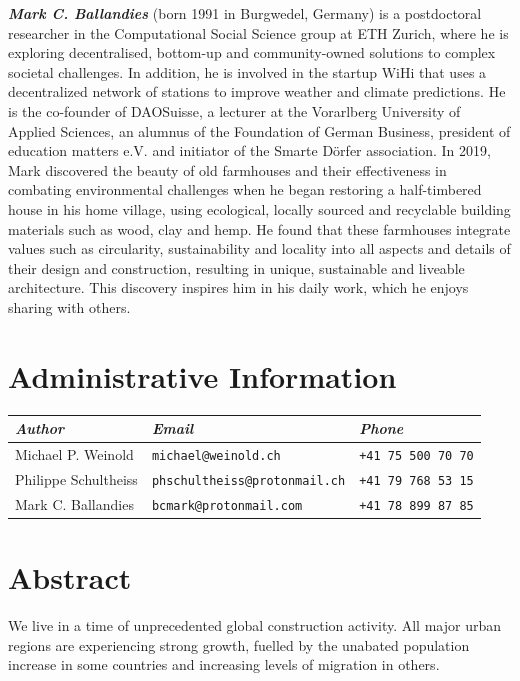 \documentclass[a4paper]{article}
\begin{document}
\textbf{\textit{Mark C. Ballandies}} (born 1991 in Burgwedel, Germany) is a postdoctoral researcher in the Computational Social Science group at ETH Zurich, where he is exploring decentralised, bottom-up and community-owned solutions to complex societal challenges. In addition, he is involved in the startup WiHi that uses a decentralized network of stations to improve weather and climate predictions. He is the co-founder of DAOSuisse, a lecturer at the Vorarlberg University of Applied Sciences, an alumnus of the Foundation of German Business, president of education matters e.V. and initiator of the Smarte Dörfer association. In 2019, Mark discovered the beauty of old farmhouses and their effectiveness in combating environmental challenges when he began restoring a half-timbered house in his home village, using ecological, locally sourced and recyclable building materials such as wood, clay and hemp. He found that these farmhouses integrate values such as circularity, sustainability and locality into all aspects and details of their design and construction, resulting in unique, sustainable and liveable architecture. This discovery inspires him in his daily work, which he enjoys sharing with others.

\clearpage

\section*{\centering Administrative Information}

\begin{NiceTabularX}{\textwidth}{llX}
\textit{Author} & \textit{Email} & \textit{Phone} \\
\hline
Michael P. Weinold & \texttt{michael@weinold.ch} & \texttt{+41 75 500 70 70} \\
Philippe Schultheiss & \texttt{phschultheiss@protonmail.ch} & \texttt{+41 79 768 53 15} \\
Mark C. Ballandies & \texttt{bcmark@protonmail.com} & \texttt{+41 78 899 87 85}
\end{NiceTabularX}

\tableofcontents

\clearpage
\section{Abstract}
\label{sec:abstract}

We live in a time of unprecedented global construction activity. All major urban regions are experiencing strong growth, fuelled by the unabated population increase in some countries and increasing levels of migration in others. \\
\end{document}
